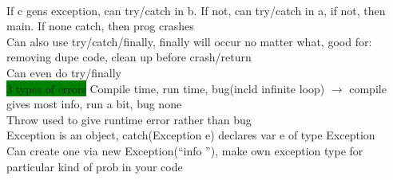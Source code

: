 \\ If c gens exception, can try/catch in b. If not, can try/catch in a, if not, then main. If none catch, then prog crashes
\\ Can also use try/catch/finally, finally will occur no matter what, good for: removing dupe code, clean up before crash/return
\\ Can even do try/finally
\\ \colorbox{Green}{3 types of errors} Compile time, run time, bug(incld infinite loop) $\rightarrow$ compile gives most info, run a bit, bug none
\\ Throw used to give runtime error rather than bug
\\ Exception is an object, catch(Exception e) declares var e of type Exception
\\ Can create one via new Exception(\textquotedblleft info \textquotedblright), make own exception type for particular kind of prob in your code